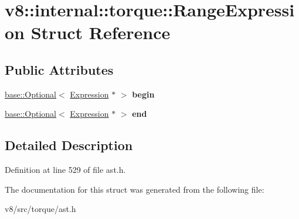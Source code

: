 \hypertarget{structv8_1_1internal_1_1torque_1_1RangeExpression}{}\section{v8\+:\+:internal\+:\+:torque\+:\+:Range\+Expression Struct Reference}
\label{structv8_1_1internal_1_1torque_1_1RangeExpression}
\subsection*{Public Attributes}
\begin{DoxyCompactItemize}
\item 
\mbox{\label{structv8_1_1internal_1_1torque_1_1RangeExpression_a03b64d3596f2fd50094cb65e9052da9f}} 
\mbox{\hyperlink{classv8_1_1base_1_1Optional}{base\+::\+Optional}}$<$ \mbox{\hyperlink{structv8_1_1internal_1_1torque_1_1Expression}{Expression}} $\ast$ $>$ {\bfseries begin}
\item 
\mbox{\label{structv8_1_1internal_1_1torque_1_1RangeExpression_a976ed3064b0e347e91c6d9b789ffd4bf}} 
\mbox{\hyperlink{classv8_1_1base_1_1Optional}{base\+::\+Optional}}$<$ \mbox{\hyperlink{structv8_1_1internal_1_1torque_1_1Expression}{Expression}} $\ast$ $>$ {\bfseries end}
\end{DoxyCompactItemize}


\subsection{Detailed Description}


Definition at line 529 of file ast.\+h.



The documentation for this struct was generated from the following file\+:\begin{DoxyCompactItemize}
\item 
v8/src/torque/ast.\+h\end{DoxyCompactItemize}
